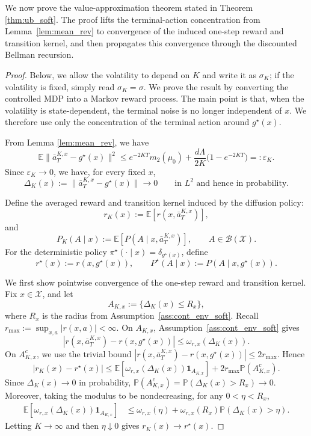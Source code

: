 \documentclass{article}
\newcommand{\1}{\mathbbm{1}}
\newcommand{\E}{\mathbb E}
\renewcommand{\H}{\mathcal{H}}
\numberwithin{equation}{section}
\def\to{\rightarrow}
\def\E{{\bf E}} \def\H{{\bf H}} \def\J{{\bf J}}
\def\E{\mathbb{E}}
\begin{document}
We now prove the value-approximation theorem stated in Theorem \ref{thm:ub_soft}. The proof lifts the terminal-action concentration from Lemma~\ref{lem:mean_rev} to convergence of the induced one-step reward and transition kernel, and then propagates this convergence through the discounted Bellman recursion.

\begin{proof}
Below, we allow the volatility to depend on \(K\) and write it as \(\sigma_K\);
if the volatility is fixed, simply read \(\sigma_K=\sigma\). We prove the result
by converting the controlled MDP into a Markov reward process. The main point is
that, when the volatility is state-dependent, the terminal noise is no longer
independent of \(x\). We therefore use only the concentration of the terminal
action around \(g^\star(x)\).

From Lemma \ref{lem:mean_rev}, we have
\[
    \E\|\bar a_T^{K,x}-g^\star(x)\|^2
    \le
    e^{-2KT}m_2(\mu_0)
    +
    \frac{d\Lambda}{2K}
    \bigl(1-e^{-2KT}\bigr)
    =:\varepsilon_K .
\]
Since \(\varepsilon_K\to0\), we have, for every fixed \(x\),
\[
    \Delta_K(x):=\|\bar a_T^{K,x}-g^\star(x)\|
    \longrightarrow 0
    \qquad\text{in }L^2\text{ and hence in probability.}
\]

Define the averaged reward and transition kernel induced by the diffusion policy:
\[
    r_K(x)
    :=
    \E\left[r(x,\bar a_T^{K,x})\right],
\]
and
\[
    P_K(A\mid x)
    :=
    \E\left[
        P(A\mid x,\bar a_T^{K,x})
    \right],
    \qquad A\in\mathcal B(\mathcal X).
\]
For the deterministic policy \(\pi^\star(\cdot\mid x)=\delta_{g^\star(x)}\), define
\[
    r^\star(x):=r(x,g^\star(x)),
    \qquad
    P^\star(A\mid x):=P(A\mid x,g^\star(x)).
\]

We first show pointwise convergence of the one-step reward and transition kernel.
Fix \(x\in\mathcal X\), and let
\[
    A_{K,x}:=\{\Delta_K(x)\le R_x\},
\]
where \(R_x\) is the radius from Assumption~\ref{ass:cont_env_soft}. Recall
$
    r_{\max}:=\sup_{x,a}|r(x,a)|<\infty .
$
On \(A_{K,x}\), Assumption~\ref{ass:cont_env_soft} gives
\[
    |r(x,\bar a_T^{K,x})-r(x,g^\star(x))|
    \le
    \omega_{r,x}(\Delta_K(x)).
\]
On \(A_{K,x}^c\), we use the trivial bound
$
    |r(x,\bar a_T^{K,x})-r(x,g^\star(x))|
    \le
    2r_{\max}.
$
Hence
\[
    |r_K(x)-r^\star(x)|
    \le
    \E\!\left[
        \omega_{r,x}(\Delta_K(x))\mathbf 1_{A_{K,x}}
    \right]
    +
    2r_{\max}\mathbb P(A_{K,x}^c).
\]
Since \(\Delta_K(x)\to0\) in probability,
$
    \mathbb P(A_{K,x}^c)
    =
    \mathbb P(\Delta_K(x)>R_x)
    \to0. 
$ 
Moreover, taking the modulus to be nondecreasing, for any \(0<\eta<R_x\),
\[
\begin{aligned}
    \E\!\left[
        \omega_{r,x}(\Delta_K(x))\mathbf 1_{A_{K,x}}
    \right]
    &\le
    \omega_{r,x}(\eta)
    +
    \omega_{r,x}(R_x)\mathbb P(\Delta_K(x)>\eta).
\end{aligned}
\]
Letting \(K\to\infty\) and then \(\eta\downarrow0\) gives
$
    r_K(x)\to r^\star(x).
$


\end{proof}
\end{document}
